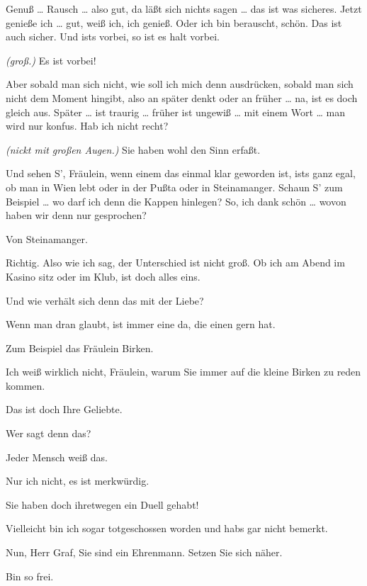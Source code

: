 \documentclass[
	final,
	a4paper,
	ngerman,
	mpinclude = true, %
	twoside = true,
	open = right,
	cleardoublepage = plain,
	DIV = 13,
	BCOR = 1cm,
	titlepage = firstiscover,
	]{scrbook}
\newcommand{\direction}[1]{\textit{(#1)}}
\newcommand{\thecharacter}[1]{\textup{\textsc{#1}}}
\newcommand{\theschauspielerin}{\thecharacter{Schauspielerin}}
\newcommand{\thegraf}{\thecharacter{Graf}}
\newcommand{\character}[1]{\item[#1:]}
\newcommand{\schauspielerin}{\character{\theschauspielerin}}
\newcommand{\graf}{\character{\thegraf}}
\begin{document}
\begin{play}
	\graf
	Genuß \ldots{} Rausch \ldots{} also gut, da läßt sich nichts sagen \ldots{} das ist was sicheres. Jetzt genieße ich \ldots{} gut, weiß ich, ich genieß. Oder ich bin berauscht, schön. Das ist auch sicher. Und ists vorbei, so ist es halt vorbei.

	\schauspielerin
	\direction{groß.} Es ist vorbei!

	\graf
	Aber sobald man sich nicht, wie soll ich mich denn ausdrücken, sobald man sich nicht dem Moment hingibt, also an später denkt oder an früher \ldots{} na, ist es doch gleich aus. Später \ldots{} ist traurig \ldots{} früher ist ungewiß \ldots{} mit einem Wort \ldots{} man wird nur konfus. Hab ich nicht recht?

	\schauspielerin
	\direction{nickt mit großen Augen.} Sie haben wohl den Sinn erfaßt.

	\graf
	Und sehen S', Fräulein, wenn einem das einmal klar geworden ist, ists ganz egal, ob man in Wien lebt oder in der Pußta oder in Steinamanger. Schaun S' zum Beispiel \ldots{} wo darf ich denn die Kappen hinlegen? So, ich dank schön \ldots{} wovon haben wir denn nur gesprochen?

	\schauspielerin
	Von Steinamanger.

	\graf
	Richtig. Also wie ich sag, der Unterschied ist nicht groß. Ob ich am Abend im Kasino sitz oder im Klub, ist doch alles eins.

	\schauspielerin
	Und wie verhält sich denn das mit der Liebe?

	\graf
	Wenn man dran glaubt, ist immer eine da, die einen gern hat.

	\schauspielerin
	Zum Beispiel das Fräulein Birken.

	\graf
	Ich weiß wirklich nicht, Fräulein, warum Sie immer auf die kleine Birken zu reden kommen.

	\schauspielerin
	Das ist doch Ihre Geliebte.

	\graf
	Wer sagt denn das?

	\schauspielerin
	Jeder Mensch weiß das.

	\graf
	Nur ich nicht, es ist merkwürdig.

	\schauspielerin
	Sie haben doch ihretwegen ein Duell gehabt!

	\graf
	Vielleicht bin ich sogar totgeschossen worden und habs gar nicht bemerkt.

	\schauspielerin
	Nun, Herr Graf, Sie sind ein Ehrenmann. Setzen Sie sich näher.

	\graf
	Bin so frei.


\end{play}
\end{document}
